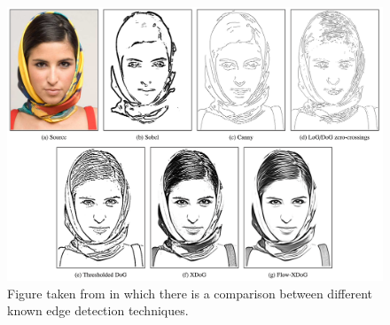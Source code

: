 \begin{figure}[htbp]
\centering
  \includegraphics[scale=0.4]{figures/comparisonOfEdgeDetectors.png}
  \caption{Figure taken from \cite{xdog} in which there is a comparison between different known edge detection techniques.}
  \label{fig:xdog-paperComparison}
\end{figure}

